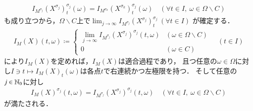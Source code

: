 \begin{prf}
\begin{description}
				\begin{align}
					I_{M^{\sigma_j}}(X^{\sigma_j})^{\sigma_j}_t(\omega) = I_{M^{\sigma_k}}(X^{\sigma_k})^{\sigma_j}_t(\omega)
					\quad (\forall t \in I,\ \omega \in \Omega \backslash C)
				\end{align}
				も成り立つから，$\Omega \backslash C$上で$\lim_{j \to \infty} I_{M^{\sigma_j}}(X^{\sigma_j})^{\sigma_j}_t\ (\forall t \in I)$
				が確定する．
				\begin{align}
					I_M(X)(t,\omega) \coloneqq 
					\begin{cases}
						\lim\limits_{j \to \infty} I_{M^{\sigma_j}}(X^{\sigma_j})^{\sigma_j}(t,\omega) & (\omega \in \Omega \backslash C) \\
						0 & (\omega \in C)
					\end{cases}
					\quad (t \in I)
				\end{align}
				により$I_M(X)$を定めれば，$I_M(X)$は適合過程であり，
				且つ任意の$\omega \in \Omega$に対し$I \ni t \longmapsto I_M(X)_t(\omega)$は各点$t$で右連続かつ左極限を持つ．
				そして任意の$j \in \mathbb{N}_0$に対し
				\begin{align}
					I_M(X)^{\sigma_j}(t,\omega) = I_{M^{\sigma_j}}(X^{\sigma_j})^{\sigma_j}(t,\omega)
					\quad (\forall t \in I,\ \omega \in \Omega \backslash C)
				\end{align}
				が満たされる．
				\QED
		\end{description}
	\end{prf}
	